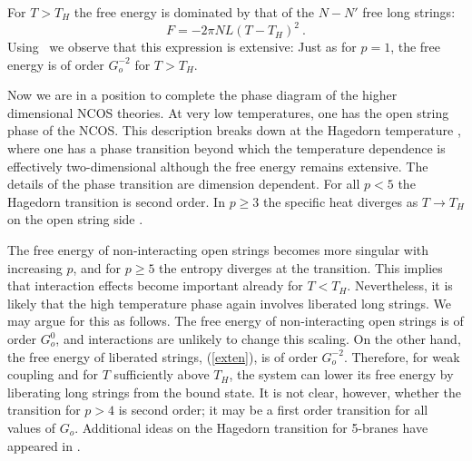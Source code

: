 For $T>T_H$ the free energy is dominated by that of the
$N-N'$ free long strings:
$$ F= - 2\pi N L (T-T_H)^2\ .
$$
Using \morep\
we observe that this expression is extensive:
Just as for $p=1$, the free energy is
of order $G_o^{-2}$ for $T> T_H$.

Now we are in a position to complete the phase diagram of the higher
dimensional NCOS theories.
At very low temperatures, one has the
open string phase of the NCOS. This description breaks down at the
Hagedorn temperature \thagedorn, where one has a phase transition
beyond which
the temperature dependence is effectively two-dimensional although
the free energy remains extensive.
The details of the phase transition are dimension dependent.
For all $p<5$ the Hagedorn transition is second order.
In $p\geq 3$ the specific heat diverges as
$T\to T_H$ on the open string side \cite{Eli}. 

The 
free energy of non-interacting open strings becomes more
singular with increasing $p$, and for $p\geq 5$ the entropy diverges at
the transition. This implies that interaction effects become
important already for $T< T_H$. Nevertheless, it is likely that
the high temperature phase again involves liberated long strings.
We may argue for this as follows. The free energy of non-interacting
open strings is of order $G_o^0$, and interactions are unlikely
to change this scaling. On the other hand, the free energy
of liberated strings, (\ref{exten}), is of order $G_o^{-2}$.
Therefore, for weak coupling and for $T$ sufficiently above $T_H$,
the system can lower its free energy by liberating long
strings from the bound state. It is not clear, however, whether
the transition for $p>4$ is second order; it may be
a first order transition for all values of $G_o$. Additional
ideas on the Hagedorn transition for 5-branes have appeared in
\cite{Berkooz,HarmarkZero,HarmarkOne}.


